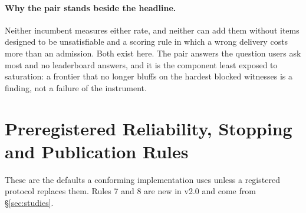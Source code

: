 \paragraph{Why the pair stands beside the headline.} Neither incumbent measures either rate, and neither can add them without items designed to be unsatisfiable and a scoring rule in which a wrong delivery costs more than an admission. Both exist here. The pair answers the question users ask most and no leaderboard answers, and it is the component least exposed to saturation: a frontier that no longer bluffs on the hardest blocked witnesses is a finding, not a failure of the instrument.

\section{Preregistered Reliability, Stopping and Publication Rules}\label{sec:reliability}

These are the defaults a conforming implementation uses unless a registered protocol replaces them. Rules 7 and 8 are new in v2.0 and come from \S\ref{sec:studies}.

